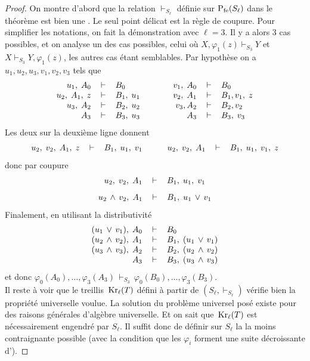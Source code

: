 \begin{proof}
On montre d'abord que la relation $\vdash_{S_\ell}$ définie sur ${{\rm P}_{{\rm fe}}}({S_\ell})$ dans 
le
théorème est bien une \entrel.
Le seul point délicat est la règle de coupure. Pour simplifier
les notations, on fait la démonstration avec $\ell=3.$
Il y a alors 3 cas possibles, et on analyse un des cas possibles, celui où
$X,\varphi_1(z)\vdash_{S_3} Y$ et $X\vdash_{S_3} Y,\varphi_1(z)$, les autres cas
étant semblables.
Par hypothèse on a $u_1,u_2,u_3,v_1,v_2,v_3$ tels que
$$\begin{array}{rclcrcl}
 u_1,\; A_0& \,\vdash\,  & B_0  &\qquad &
 v_1,\; A_0& \,\vdash\,  & B_0  \\
 u_2,\; A_1,\; z& \,\vdash\,  & B_1 ,\; u_1  &&
 v_2,\; A_1& \,\vdash\,  & B_1 , v_1 ,\; z \\
 u_3,\; A_{2}& \,\vdash\,  & B_{2} ,\; u_{2}  &&
 v_3, A_{2}& \,\vdash\,  & B_{2} , v_{2}  \\
 A_3& \,\vdash\,  & B_3 ,\; u_3  &&
 A_3& \,\vdash\,  & B_3 ,\; v_3
\end{array}$$
Les deux \entrels sur la deuxième ligne donnent
$$\begin{array}{rclcrcl}
 u_2,\;v_2,\; A_1,\; z& \,\vdash\,  & B_1 ,\; u_1,\;v_1 &\qquad
 u_2,\;v_2,\; A_1& \,\vdash\,  & B_1 ,\; u_1 ,\; v_1 ,\; z \end{array}$$
donc par coupure
$$\begin{array}{rclcrcl}
 u_2,\;v_2,\; A_1& \,\vdash\,  & B_1 ,\; u_1,\;v_1
\end{array}$$
\cad
$$\begin{array}{rclcrcl}
 u_2\,\wedge\, v_2,\; A_1& \,\vdash\,  & B_1 ,\; u_1\,\vee\, v_1
\end{array}$$
Finalement,  en utilisant la distributivité
$$\begin{array}{rclcrcl}
 (u_1\,\vee\, v_1),\; A_0& \,\vdash\,  & B_0   \\
 (u_2\,\wedge\, v_2),\; A_1& \,\vdash\,&B_1,\;(u_1\,\vee\, v_1)\\
 (u_3\,\wedge\, v_3),\; A_{2}& \,\vdash\,  & B_{2},\;(u_2\,\wedge\, v_2)  \\
 A_3& \,\vdash\,  & B_3, \;(u_3\,\wedge\, v_3)
\end{array}$$
et donc $\varphi_0(A_0),\dots,\varphi_3(A_3)\,\vdash_{S_3}\,
\varphi_0(B_0),\dots,\varphi_3(B_3)$.\\
Il reste à voir que le treillis  $\,{\rm Kr}_\ell(T)$ défini à partir de
$({S_\ell},\vdash_{S_\ell})$ vérifie bien la propriété universelle voulue. La
solution du problème universel posé existe pour des raisons
générales d'algèbre universelle.
Et on sait que  $\,{\rm Kr}_\ell(T)$  est nécessairement engendré par ${S_\ell}$. Il
suffit donc de définir  sur $S_\ell$ la \entrel la moins contraignante possible
(avec la condition que les $\varphi_i$ forment une suite décroissante
d'\homos).


\end{proof}
